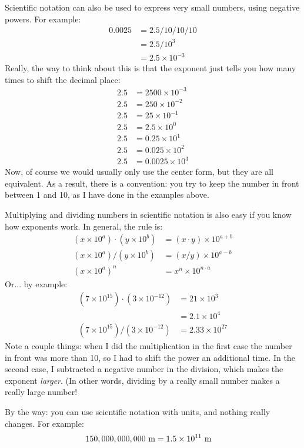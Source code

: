 \documentclass[12pt, letterpaper]{article}
\begin{document}
Scientific notation can also be used to express very small numbers, using negative powers.
For example:
\begin{align}
	0.0025 &= 2.5 / 10 / 10 / 10\\
	&= 2.5 / 10^3\\
	&= 2.5 \times 10^{-3}
\end{align}
Really, the way to think about this is that the exponent just tells you how many times to shift the decimal place:
\begin{align} 
	2.5 &= 2500 \times 10^{-3}\\
	2.5 &= 250 \times 10^{-2}\\ 
	2.5 &= 25 \times 10^{-1}\\ 
	2.5 &= 2.5 \times 10^0\\
	2.5 &= 0.25 \times 10^1\\ 
	2.5 &= 0.025 \times 10^2\\ 
	2.5 &= 0.0025 \times 10^3
\end{align}
Now, of course we would usually only use the center form, but they are all equivalent.
As a result, there is a convention: you try to keep the number in front between 1 and 10, as I have done in the examples above.

Multiplying and dividing numbers in scientific notation is also easy if you know how exponents work.
In general, the rule is:
\begin{align}
	(x \times 10^a) \cdot (y \times 10^b) &= (x \cdot y) \times 10^{a + b}\\
	(x \times 10^a) / (y \times 10^b) &= (x / y) \times 10^{a - b}\\
	(x \times 10^a)^n &= x^n \times 10^{n \cdot a}
\end{align}
Or... by example:
\begin{align}
	(7 \times 10^{15}) \cdot (3 \times 10^{-12}) &= 21 \times 10^3\\
	&= 2.1 \times 10^4\\
	(7 \times 10^{15}) / (3 \times 10^{-12}) &= 2.33 \times 10^{27}
\end{align}
Note a couple things: when I did the multiplication in the first case the number in front was more than 10, so I had to shift the power an additional time.
In the second case, I subtracted a negative number in the division, which makes the exponent \emph{larger}. 
(In other words, dividing by a really small number makes a really large number!

By the way: you can use scientific notation with units, and nothing really changes.  For example:
\begin{align}
150,000,000,000 \textrm{ m} &= 1.5 \times 10^{11} \textrm{ m} 
\end{align}
\end{document}
